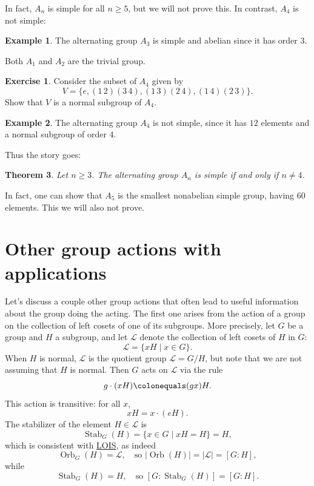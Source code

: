 \documentclass[12pt]{report}
\newtheorem{theorem}{Theorem}[chapter]
\numberwithin{equation}{section}
\numberwithin{theorem}{chapter}
\theoremstyle{definition}
\newtheorem{example}[theorem]{Example}
\newtheorem{exercise}{Exercise}
\newtheorem*{basic properties}{Basic Properties}
\newtheorem*{Important Remark}{Important Remark}
\DeclareMathOperator{\Orb}{Orb}
\DeclareMathOperator{\Stab}{Stab}
\begin{document}
In fact, $A_n$ is simple for all $n \geqslant 5$, but we will not prove this. In contrast, $A_4$ is not simple:



\begin{example}
	The alternating group $A_3$ is simple and abelian since it has order $3$. 
\end{example}

Both $A_1$ and $A_2$ are the trivial group. 


\begin{exercise}
	Consider the subset of $A_4$ given by
	$$V = \{e,  (1 \, 2)(3 \, 4),  (1 \, 3)(2 \, 4),  (1 \, 4)(2 \, 3)\}.$$
	Show that $V$ is a normal subgroup of $A_4$.
\end{exercise}

\begin{example}
	The alternating group $A_4$ is not simple, since it has $12$ elements and a normal subgroup of order $4$.
\end{example}
 
 
 Thus the story goes:

\begin{theorem}
	Let $n \geqslant 3$. The alternating group $A_n$ is simple if and only if $n \neq 4$.
\end{theorem}



In fact, one can show that $A_5$ is the smallest nonabelian simple group, having $60$ elements. This we will also not prove.






\section{Other group actions with applications}

Let's discuss a couple other group actions that often lead to useful information about the group doing the acting.
The first one arises from the action of a group on the collection of left cosets of one of its subgroups.
More precisely, let $G$ be a group and $H$ a subgroup, and let $\mathcal{L}$ denote the collection of left cosets of $H$ in $G$: 
$$\mathcal{L} = \{xH \mid x \in G\}.$$ 
When $H$ is normal, $\mathcal{L}$ is the quotient group $\mathcal{L} = G/H$, but note that we are not assuming that $H$ is normal. Then $G$ acts on $\mathcal{L}$ via the rule
$$g \cdot (xH) \colonequals (gx)H.$$
This action is transitive: for all $x$, 
$$xH = x \cdot (eH).$$ 
The stabilizer of the element $H \in \mathcal{L}$ is
$$\Stab_G(H) = \{x \in G \mid xH = H\} = H,$$
which is consistent with \hyperref[lois]{LOIS}, as indeed 
$$\Orb_G(H) = \mathcal{L}, \quad \textrm{so } |\Orb(H)| = |\mathcal{L}| = [G : H],$$
while
$$\Stab_G(H) = H, \quad \textrm{so } [G: \Stab_G(H)] = [G : H].$$
\end{document}
